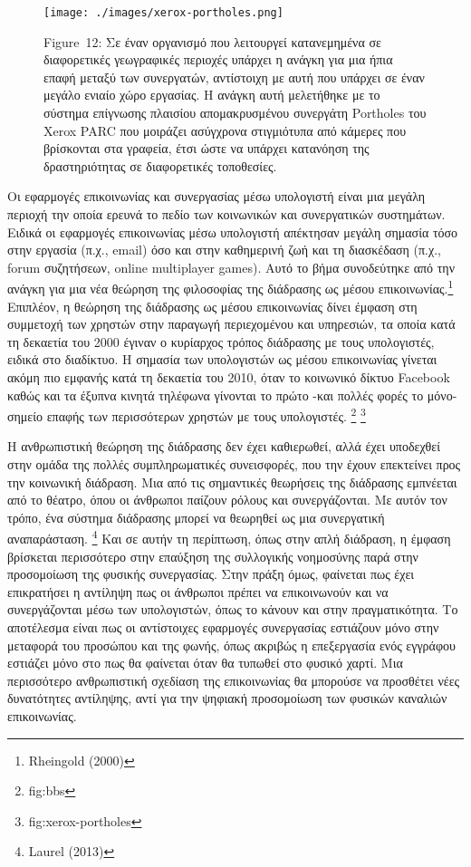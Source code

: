 \documentclass[
]{article}
\begin{document}
\leavevmode{}%
\begin{figure}
\hypertarget{fig:xerox-portholes}{%
\centering
\texttt{[image: ./images/xerox-portholes.png]}
\caption{Figure~12: Σε έναν οργανισμό που λειτουργεί κατανεμημένα σε
διαφορετικές γεωγραφικές περιοχές υπάρχει η ανάγκη για μια ήπια επαφή
μεταξύ των συνεργατών, αντίστοιχη με αυτή που υπάρχει σε έναν μεγάλο
ενιαίο χώρο εργασίας. Η ανάγκη αυτή μελετήθηκε με το σύστημα επίγνωσης
πλαισίου απομακρυσμένου συνεργάτη Portholes του Xerox PARC που μοιράζει
ασύγχρονα στιγμιότυπα από κάμερες που βρίσκονται στα γραφεία, έτσι ώστε
να υπάρχει κατανόηση της δραστηριότητας σε διαφορετικές
τοποθεσίες.}\label{fig:xerox-portholes}
}
\end{figure}

Οι εφαρμογές επικοινωνίας και συνεργασίας μέσω υπολογιστή είναι μια
μεγάλη περιοχή την οποία ερευνά το πεδίο των κοινωνικών και συνεργατικών
συστημάτων. Ειδικά οι εφαρμογές επικοινωνίας μέσω υπολογιστή απέκτησαν
μεγάλη σημασία τόσο στην εργασία (π.χ., email) όσο και στην καθημερινή
ζωή και τη διασκέδαση (π.χ., forum συζητήσεων, online multiplayer
games). Αυτό το βήμα συνοδεύτηκε από την ανάγκη για μια νέα θεώρηση της
φιλοσοφίας της διάδρασης ως μέσου επικοινωνίας.\footnote{Rheingold
  (2000)} Επιπλέον, η θεώρηση της διάδρασης ως μέσου επικοινωνίας δίνει
έμφαση στη συμμετοχή των χρηστών στην παραγωγή περιεχομένου και
υπηρεσιών, τα οποία κατά τη δεκαετία του 2000 έγιναν ο κυρίαρχος τρόπος
διάδρασης με τους υπολογιστές, ειδικά στο διαδίκτυο. Η σημασία των
υπολογιστών ως μέσου επικοινωνίας γίνεται ακόμη πιο εμφανής κατά τη
δεκαετία του 2010, όταν το κοινωνικό δίκτυο Facebook καθώς και τα έξυπνα
κινητά τηλέφωνα γίνονται το πρώτο -και πολλές φορές το μόνο- σημείο
επαφής των περισσότερων χρηστών με τους υπολογιστές. \footnote{fig:bbs}
\footnote{fig:xerox-portholes}

Η ανθρωπιστική θεώρηση της διάδρασης δεν έχει καθιερωθεί, αλλά έχει
υποδεχθεί στην ομάδα της πολλές συμπληρωματικές συνεισφορές, που την
έχουν επεκτείνει προς την κοινωνική διάδραση. Μια από τις σημαντικές
θεωρήσεις της διάδρασης εμπνέεται από το θέατρο, όπου οι άνθρωποι
παίζουν ρόλους και συνεργάζονται. Με αυτόν τον τρόπο, ένα σύστημα
διάδρασης μπορεί να θεωρηθεί ως μια συνεργατική αναπαράσταση.
\footnote{Laurel (2013)} Και σε αυτήν τη περίπτωση, όπως στην απλή
διάδραση, η έμφαση βρίσκεται περισσότερο στην επαύξηση της συλλογικής
νοημοσύνης παρά στην προσομοίωση της φυσικής συνεργασίας. Στην πράξη
όμως, φαίνεται πως έχει επικρατήσει η αντίληψη πως οι άνθρωποι πρέπει να
επικοινωνούν και να συνεργάζονται μέσω των υπολογιστών, όπως το κάνουν
και στην πραγματικότητα. Το αποτέλεσμα είναι πως οι αντίστοιχες
εφαρμογές συνεργασίας εστιάζουν μόνο στην μεταφορά του προσώπου και της
φωνής, όπως ακριβώς η επεξεργασία ενός εγγράφου εστιάζει μόνο στο πως θα
φαίνεται όταν θα τυπωθεί στο φυσικό χαρτί. Μια περισσότερο ανθρωπιστική
σχεδίαση της επικοινωνίας θα μπορούσε να προσθέτει νέες δυνατότητες
αντίληψης, αντί για την ψηφιακή προσομοίωση των φυσικών καναλιών
επικοινωνίας.
\end{document}
